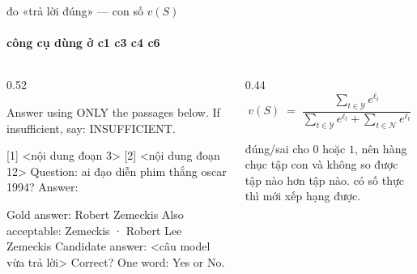 \begin{frame}[fragile]{đo «trả lời đúng» — con số $v(S)$}
  \framesubtitle{công cụ dùng ở c1 c3 c4 c6}

  \begin{columns}[t]
  \begin{column}{0.52\textwidth}
    \begin{bx}[title={lượt 1 · bắt model trả lời, chỉ từ $S$}]
      \begin{dia}
Answer using ONLY the passages below.
If insufficient, say: INSUFFICIENT.

[1] <nội dung đoạn 3>
[2] <nội dung đoạn 12>
Question: ai đạo diễn phim thắng oscar 1994?
Answer:
      \end{dia}
    \end{bx}
    \begin{bx}[title={lượt 2 · một model khác chấm đúng/sai}]
      \begin{dia}
Gold answer: Robert Zemeckis
Also acceptable: Zemeckis · Robert Lee Zemeckis
Candidate answer: <câu model vừa trả lời>
Correct? One word: Yes or No.
      \end{dia}
    \end{bx}
  \end{column}
  \begin{column}{0.44\textwidth}
    \[
      v(S) \;=\;
      \frac{\sum_{t \in \mathcal{Y}} e^{\ell_t}}
           {\sum_{t \in \mathcal{Y}} e^{\ell_t} + \sum_{t \in \mathcal{N}} e^{\ell_t}}
    \]

    \vspace{0.4em}
    \begin{keyb}[title={vì sao cần một số, không phải đúng/sai}]
      đúng/sai cho $0$ hoặc $1$, nên hàng chục tập con  và không so
      được tập nào hơn tập nào. có số thực thì mới xếp hạng được.
    \end{keyb}
  \end{column}
  \end{columns}
\end{frame}

